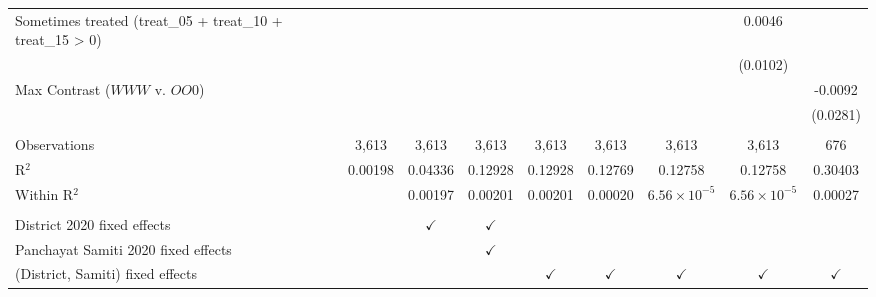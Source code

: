 \begin{tabular}{lcccccccc}
   Sometimes treated (treat\_05 + treat\_10 + treat\_15 > 0)           &                &                        &               &               &               &                       & 0.0046                &   \\   
                                                                       &                &                        &               &               &               &                       & (0.0102)              &   \\   
    Max Contrast ($WWW$ v. $OO0$)                                      &                &                        &               &               &               &                       &                       & -0.0092\\   
                                                                       &                &                        &               &               &               &                       &                       & (0.0281)\\   
    \\
   Observations                                                        & 3,613          & 3,613                  & 3,613         & 3,613         & 3,613         & 3,613                 & 3,613                 & 676\\  
   R$^2$                                                               & 0.00198        & 0.04336                & 0.12928       & 0.12928       & 0.12769       & 0.12758               & 0.12758               & 0.30403\\  
   Within R$^2$                                                        &                & 0.00197                & 0.00201       & 0.00201       & 0.00020       & $6.56\times 10^{-5}$  & $6.56\times 10^{-5}$  & 0.00027\\  
    \\
   District 2020 fixed effects                                         &                & $\checkmark$           & $\checkmark$  &               &               &                       &                       & \\  
   Panchayat Samiti 2020 fixed effects                                 &                &                        & $\checkmark$  &               &               &                       &                       & \\  
   (District, Samiti) fixed effects                                    &                &                        &               & $\checkmark$  & $\checkmark$  & $\checkmark$          & $\checkmark$          & $\checkmark$\\   
   \bottomrule
\end{tabular}
\par\endgroup


